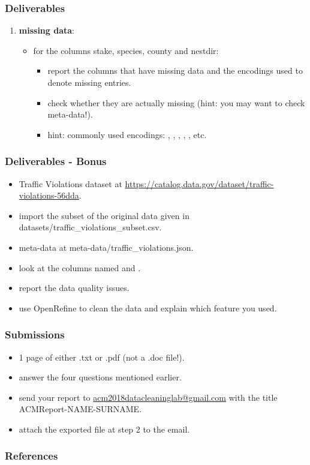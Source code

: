 \documentclass{beamer}					%
\begin{document}
 \begin{frame}[c]
 \frametitle{Deliverables}
 \begin{enumerate}
 \setcounter{enumi}{\theenumTemp}
\item \textbf{missing data}:
\begin{itemize}
\item for the columns stake, species, county and nestdir:
\begin{itemize}
\item report the columns that have missing data and the encodings used to denote missing entries.
\item check whether they are actually missing (hint: you may want to check meta-data!).
\item hint: commonly used encodings: , , , , , etc. 
\end{itemize}
\end{itemize}
 \end{enumerate}
\end{frame}

 \begin{frame}[c]
 \frametitle{Deliverables - Bonus}
 \begin{itemize}
 \item Traffic Violations dataset at \footnotesize{\url{https://catalog.data.gov/dataset/traffic-violations-56dda}}.
 \item import the subset of the original data given in datasets/traffic\_violations\_subset.csv.
 \item meta-data at meta-data/traffic\_violations.json.
 \item look at the columns named  and .
 \item report the data quality issues.
 \item use OpenRefine to clean the data and explain which feature you used.
 \end{itemize}
\end{frame}


\begin{frame}[c]
 \frametitle{Submissions}
 \begin{itemize}
\item 1 page of either .txt or .pdf (not a .doc file!).
\item answer the four questions mentioned earlier.
\item send your report to \footnotesize{\url{acm2018datacleaninglab@gmail.com}} with the title ACMReport-NAME-SURNAME.
\item attach the exported file at step 2 to the email.
 \end{itemize}
\end{frame}

\begin{frame}[t, allowframebreaks]
\frametitle{References}

\end{frame}
\end{document}
